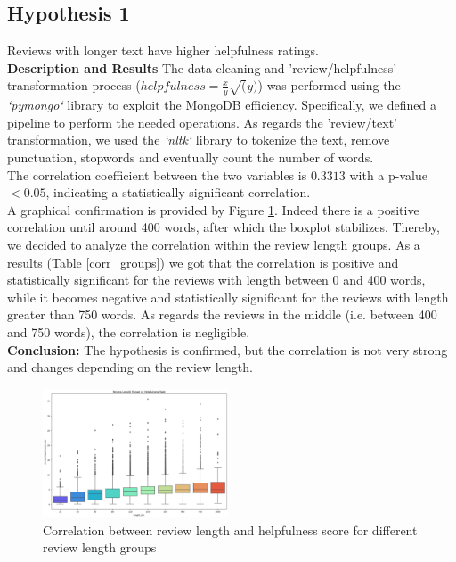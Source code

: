 \subsection*{Hypothesis 1}

Reviews with longer text have higher helpfulness ratings.\\

\noindent
\textbf{Description and Results}
The data cleaning and 'review/helpfulness' transformation process ($helpfulness = \frac{x}{y} \sqrt(y)$) was performed using the \textit{`pymongo`} library to exploit the 
MongoDB efficiency. Specifically, we defined a pipeline to perform the needed operations. As regards the 
'review/text' transformation, we used the \textit{`nltk`} library to tokenize the text, remove punctuation, stopwords and eventually
count the number of words.\\
The correlation coefficient between the two variables is $0.3313$ with a p-value $<0.05$, indicating a statistically significant correlation.\\
A graphical confirmation is provided by Figure \ref{fig:h1_boxplot}. Indeed there is a positive correlation until around 400 words, after which the
boxplot stabilizes. Thereby, we decided to analyze the correlation within the review length groups. As a results (Table \ref{corr_groups}) we got that the correlation is
positive and statistically significant for the reviews with length between 0 and 400 words, while it becomes negative and statistically significant
for the reviews with length greater than 750 words. As regards the reviews in the middle (i.e. between 400 and 750 words), the correlation is negligible.\\
\textbf{Conclusion:} The hypothesis is confirmed, but the correlation is not very strong and changes depending on the review length.\\

\begin{figure}[H]
    \centering
    \includegraphics[width=0.49\textwidth]{./figures/h1_boxplot.png}
    \caption{Correlation between review length and helpfulness score for different review length groups}
    \label{fig:h1_boxplot}
\end{figure}

